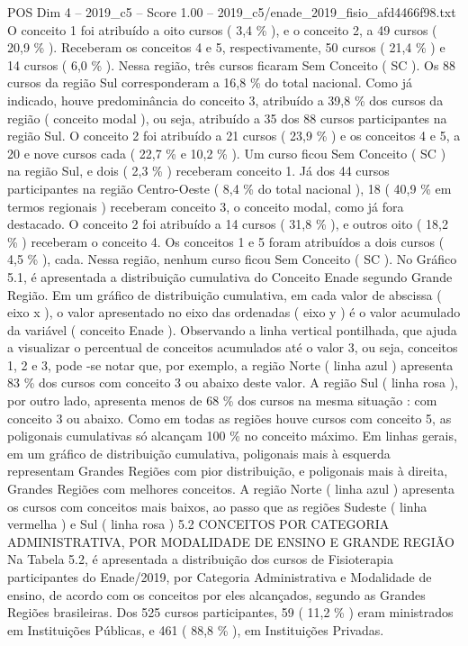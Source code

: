 \begin{textsample}{POS Dim 4 – 2019\_c5 – Score 1.00 – 2019\_c5/enade\_2019\_fisio\_afd4466f98.txt}
O conceito 1 foi atribuído a oito cursos ( 3,4 \% ), e o conceito 2, a 49 cursos ( 20,9 \% ).
Receberam os conceitos 4 e 5, respectivamente, 50 cursos ( 21,4 \% ) e 14 cursos ( 6,0 \% ).
Nessa região, três cursos ficaram Sem Conceito ( SC ).
Os 88 cursos da região Sul corresponderam a 16,8 \% do total nacional.
Como já indicado, houve predominância do conceito 3, atribuído a 39,8 \% dos cursos da região ( conceito modal ), ou seja, atribuído a 35 dos 88 cursos participantes na região Sul.
O conceito 2 foi atribuído a 21 cursos ( 23,9 \% ) e os conceitos 4 e 5, a 20 e nove cursos cada ( 22,7 \% e 10,2 \% ).
Um curso ficou Sem Conceito ( SC ) na região Sul, e dois ( 2,3 \% ) receberam conceito 1.
Já dos 44 cursos participantes na região Centro-Oeste ( 8,4 \% do total nacional ), 18 ( 40,9 \% em termos regionais ) receberam conceito 3, o conceito modal, como já fora destacado.
O conceito 2 foi atribuído a 14 cursos ( 31,8 \% ), e outros oito ( 18,2 \% ) receberam o conceito 4.
Os conceitos 1 e 5 foram atribuídos a dois cursos ( 4,5 \% ), cada.
Nessa região, nenhum curso ficou Sem Conceito ( SC ).
No Gráfico 5.1, é apresentada a distribuição cumulativa do Conceito Enade segundo Grande Região.
Em um gráfico de distribuição cumulativa, em cada valor de abscissa ( eixo x ), o valor apresentado no eixo das ordenadas ( eixo y ) é o valor acumulado da variável ( conceito Enade ).
Observando a linha vertical pontilhada, que ajuda a visualizar o percentual de conceitos acumulados até o valor 3, ou seja, conceitos 1, 2 e 3, pode -se notar que, por exemplo, a região Norte ( linha azul ) apresenta 83 \% dos cursos com conceito 3 ou abaixo deste valor.
A região Sul ( linha rosa ), por outro lado, apresenta menos de 68 \% dos cursos na mesma situação : com conceito 3 ou abaixo.
Como em todas as regiões houve cursos com conceito 5, as poligonais cumulativas só alcançam 100 \% no conceito máximo.
Em linhas gerais, em um gráfico de distribuição cumulativa, poligonais mais à esquerda representam Grandes Regiões com pior distribuição, e poligonais mais à direita, Grandes Regiões com melhores conceitos.
A região Norte ( linha azul ) apresenta os cursos com conceitos mais baixos, ao passo que as regiões Sudeste ( linha vermelha ) e Sul ( linha rosa ) 5.2 CONCEITOS POR CATEGORIA ADMINISTRATIVA, POR MODALIDADE DE ENSINO E GRANDE REGIÃO Na Tabela 5.2, é apresentada a distribuição dos cursos de Fisioterapia participantes do Enade/2019, por Categoria Administrativa e Modalidade de ensino, de acordo com os conceitos por eles alcançados, segundo as Grandes Regiões brasileiras.
Dos 525 cursos participantes, 59 ( 11,2 \% ) eram ministrados em Instituições Públicas, e 461 ( 88,8 \% ), em Instituições Privadas.

\end{textsample}
